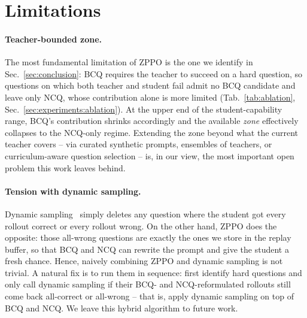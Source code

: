 \section*{Limitations}
\label{sec:limitations}
\paragraph{Teacher-bounded zone.}
The most fundamental limitation of ZPPO is the one we identify in Sec.~\ref{sec:conclusion}: BCQ requires the teacher to succeed on a hard question, so questions on which both teacher and student fail admit no BCQ candidate and leave only NCQ, whose contribution alone is more limited (Tab.~\ref{tab:ablation}, Sec.~\ref{sec:experiments:ablation}). At the upper end of the student-capability range, BCQ's contribution shrinks accordingly and the available \emph{zone} effectively collapses to the NCQ-only regime. Extending the zone beyond what the current teacher covers -- via curated synthetic prompts, ensembles of teachers, or curriculum-aware question selection -- is, in our view, the most important open problem this work leaves behind.

\paragraph{Tension with dynamic sampling.}
Dynamic sampling~\citep{yu2025dapo} simply deletes any question where the student got every rollout correct or every rollout wrong. On the other hand, ZPPO does the opposite: those all-wrong questions are exactly the ones we store in the replay buffer, so that BCQ and NCQ can rewrite the prompt and give the student a fresh chance. Hence, naively combining ZPPO and dynamic sampling is not trivial. A natural fix is to run them in sequence: first identify hard questions and only call dynamic sampling if their BCQ- and NCQ-reformulated rollouts still come back all-correct or all-wrong -- that is, apply dynamic sampling on top of BCQ and NCQ. We leave this hybrid algorithm to future work.

